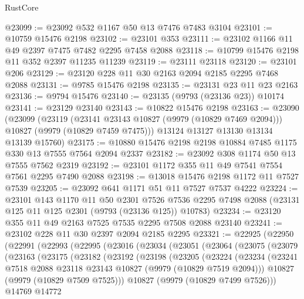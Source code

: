 \begin{lexlean}{RustCore}
\begin{coremodule}
@23099 := @23092 @532 @1167 @50 @13 @7476 @7483 @3104
@23101 := @10759 @15476 @2198
@23102 := @23101 @353
@23111 := @23102 @1166 @11 @49 @2397 @7475 @7482 @2295 @7458 @2088
@23118 := @10799 @15476 @2198 @11 @352 @2397 @11235 @11239
@23119 := @23111 @23118
@23120 := @23101 @206
@23129 := @23120 @228 @11 @30 @2163 @2094 @2185 @2295 @7468 @2088
@23131 := @9785 @15476 @2198
@23135 := @23131 @23 @11 @23 @2163
@23136 := @9794 @15476
@23140 := @23135 (@9793 (@23136 @23)) @10174
@23141 := @23129 @23140
@23143 := @10822 @15476 @2198
@23163 := @23090
    (@23099
      (@23119
        (@23141 @23143 @10827 (@9979 (@10829 @7469 @2094)))
        @10827
        (@9979 (@10829 @7459 @7475)))
      @13124
      @13127
      @13130
      @13134
      @13139
      @15760)
@23175 := @10880 @15476 @2198 @2198 @10884 @7485 @1175 @330 @13 @7555 @7564 @2094 @2337
@23182 := @23092 @308 @1174 @50 @13 @7555 @7562 @2319
@23192 := @23101 @1172 @355 @11 @49 @7541 @7554 @7561 @2295 @7490 @2088
@23198 := @13018 @15476 @2198 @1172 @11 @7527 @7539
@23205 := @23092 @641 @1171 @51 @11 @7527 @7537 @4222
@23224 := @23101
    @143
    @1170
    @11
    @50
    @2301
    @7526
    @7536
    @2295
    @7498
    @2088
    (@23131 @125 @11 @125 @2301 (@9793 (@23136 @125)) @10783)
@23234 := @23120 @355 @11 @49 @2163 @7525 @7535 @2295 @7508 @2088 @23140
@23241 := @23102 @228 @11 @30 @2397 @2094 @2185 @2295
@23321 := @22925
    (@22950
      (@22991
        (@22993
          (@22995
            (@23016
              (@23034
                (@23051
                  (@23064
                    (@23075
                      (@23079
                        (@23163
                          (@23175
                            (@23182
                              (@23192
                                (@23198
                                  (@23205
                                    (@23224
                                      (@23234
                                        (@23241
                                          @7518
                                          @2088
                                          @23118
                                          @23143
                                          @10827
                                          (@9979 (@10829 @7519 @2094)))
                                        @10827
                                        (@9979 (@10829 @7509 @7525)))
                                      @10827
                                      (@9979 (@10829 @7499 @7526)))
                                    @14769
                                    @14772

\end{coremodule}
\end{lexlean}
